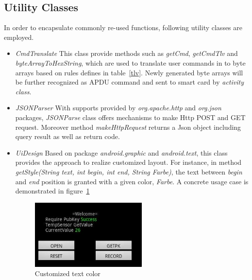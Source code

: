 \subsection{Utility Classes}
In order to encapsulate commonly re-used functions, following utility classes are employed.
\begin{itemize}
\item \emph{CmdTranslate} This class provide methods such as \emph{getCmd}, \emph{getCmdTlv} and \emph{byteArrayToHexString}, which are used to translate user commands in to byte arrays based on rules defines in table~\ref{tlv}. Newly generated byte arrays will be further recognized as APDU command and sent to smart card by \emph{activity class}.
\item \emph{JSONParser} With supports provided by \emph{org.apache.http} and \emph{org.json} packages, \emph{JSONParse} class offers mechanisms to make Http POST and GET request. Moreover method \emph{makeHttpRequest} returns a Json object including query result as well as return code.
\item \emph{UiDesign} Based on package \emph{android.graphic} and \emph{android.text}, this class provides the approach to realize customized layout. For instance, in method \emph{getStyle(String text, int begin, int end, String Farbe)}, the text between \emph{begin} and \emph{end} position is granted with a given color,  \emph{Farbe}. A concrete usage case is demonstrated in figure~\ref{fig:get-style}

\begin{figure}[!htbp]
	\centering
	\includegraphics[width=0.55\textwidth]{get-style.jpg}
		\caption{Customized text color}
	\label{fig:get-style}
\end{figure}

\end{itemize} 
